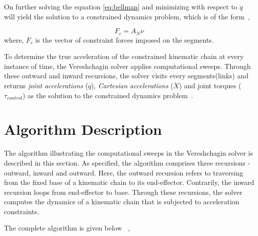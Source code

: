  On further solving the equation \ref{eq:bellman} and minimizing with respect to $\ddot{q}$ will yield the solution to a constrained dynamics problem, which is of the form~\cite{shakhimardanov2015composable}, 
 
  \begin{equation}\label{eq:solution}
  F_c = A_N \nu
  \end{equation}
where, $F_c$ is the vector of constraint forces imposed on the segments.


To determine the true acceleration of the constrained kinematic chain at every instance of time, the Vereshchagin solver applies computational sweeps. Through these outward and inward recursions, the solver visits every segments(links) and returns \textit{joint accelerations} ($\ddot{q}$), \textit{Cartesian accelerations} ($\ddot{X}$) and joint torques ($\tau_{control}$) as the solution to the constrained dynamics problem~\cite{shakhimardanov2015composable}. 

\section{Algorithm Description}

The algorithm illustrating the computational sweeps in the Vereshchagin solver is described in this section. As specified, the algorithm comprises three recursions - outward, inward and outward. Here, the outward recursion refers to traversing from the fixed base of a kinematic chain to its end-effector. Contrarily, the inward recursion loops from end-effector to base. Through these recursions, the solver computes the dynamics of a kinematic chain that is subjected to acceleration constraints. 

	The complete algorithm is given below~\cite{shakhimardanov2015composable} \cite{vereshchagin1989modeling},

